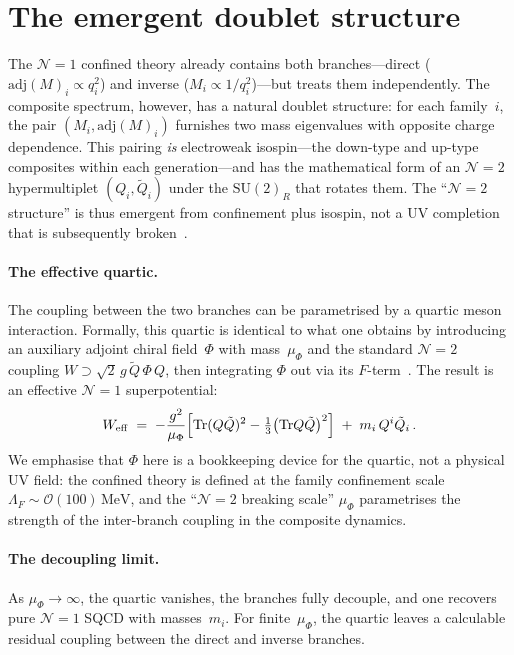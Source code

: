 \documentclass[preprint,12pt]{elsarticle}
\newcommand{\SU}{\mathrm{SU}}
\newcommand{\Tr}{\mathrm{Tr}}
\newcommand{\adj}{\mathrm{adj}}
\newcommand{\MeV}{\,\mathrm{MeV}}
\begin{document}
\section{The emergent doublet structure}
\label{sec:N2}

The $\mathcal{N}{=}1$ confined theory already contains both
branches---direct ($\adj(M)_i \propto q_i^2$) and inverse
($M_i \propto 1/q_i^2$)---but treats them independently.
The composite spectrum, however, has a natural doublet structure:
for each family~$i$, the pair $(M_i, \adj(M)_i)$ furnishes
two mass eigenvalues with opposite charge dependence.
This pairing \emph{is} electroweak isospin---the down-type
and up-type composites within each generation---and has the
mathematical form of an $\mathcal{N}{=}2$ hypermultiplet
$(Q_i, \tilde{Q}_i)$ under the $\SU(2)_R$ that rotates them.
The ``$\mathcal{N}{=}2$ structure'' is thus emergent from
confinement plus isospin, not a UV completion that is subsequently
broken~\cite{APS:1997,SeibergWitten:1994a}.

\paragraph{The effective quartic.}
The coupling between the two branches can be parametrised by a
quartic meson interaction.
Formally, this quartic is identical to what one obtains by
introducing an auxiliary adjoint chiral field~$\Phi$ with
mass~$\mu_\Phi$ and the standard $\mathcal{N}{=}2$
coupling $W \supset \sqrt{2}\,g\,\tilde{Q}\,\Phi\,Q$,
then integrating $\Phi$ out via its $F$-term~\cite{APS:1997}.
The result is an effective $\mathcal{N}{=}1$
superpotential:
\begin{equation}
  W_{\rm eff} \;=\;
  -\frac{g^2}{\mu_\Phi}\Bigl[\Tr(Q\tilde{Q})^2
  - \tfrac{1}{3}\bigl(\Tr Q\tilde{Q}\bigr)^2\Bigr]
  \;+\; m_i\,Q^i\tilde{Q}_i\,.
  \label{eq:Weff}
\end{equation}
We emphasise that $\Phi$ here is a bookkeeping device for
the quartic, not a physical UV field: the confined theory
is defined at the family confinement scale
$\Lambda_F \sim \mathcal{O}(100)\MeV$, and the
``$\mathcal{N}{=}2$ breaking scale'' $\mu_\Phi$ parametrises
the strength of the inter-branch coupling in the
composite dynamics.

\paragraph{The decoupling limit.}
As $\mu_\Phi \to \infty$, the quartic vanishes, the branches
fully decouple, and one recovers pure $\mathcal{N}{=}1$
SQCD with masses~$m_i$.
For finite~$\mu_\Phi$, the quartic leaves a calculable
residual coupling between the direct and inverse branches.
\end{document}
